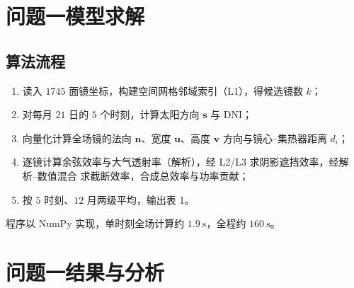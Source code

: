 \documentclass[12pt,a4paper]{ctexart}
\begin{document}
\section{问题一模型求解}
\subsection{算法流程}
\begin{enumerate}
  \item 读入 $1745$ 面镜坐标，构建空间网格邻域索引（L1），得候选镜数 $k$；
  \item 对每月 $21$ 日的 $5$ 个时刻，计算太阳方向 $\boldsymbol{s}$ 与 DNI；
  \item 向量化计算全场镜的法向 $\boldsymbol{n}$、宽度 $\boldsymbol{u}$、高度 $\boldsymbol{v}$
        方向与镜心--集热器距离 $d_i$；
  \item 逐镜计算余弦效率与大气透射率（解析），经 L2/L3 求阴影遮挡效率，经解析--数值混合
        求截断效率，合成总效率与功率贡献；
  \item 按 $5$ 时刻、$12$ 月两级平均，输出表 1。
\end{enumerate}
程序以 NumPy 实现，单时刻全场计算约 $1.9\ \text{s}$，全程约 $160\ \text{s}$。

\section{问题一结果与分析}
\end{document}
